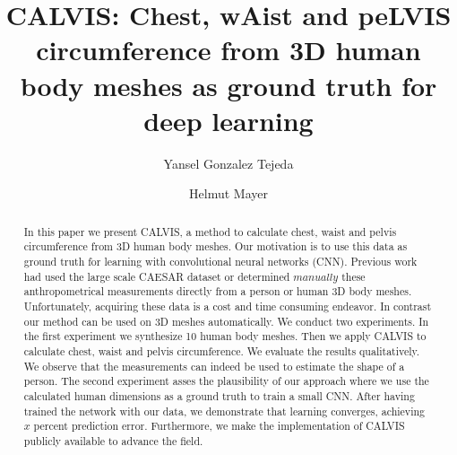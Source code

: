 \documentclass[runningheads, orivec]{llncs}
\begin{document}
%
\title{CALVIS: Chest, wAist and peLVIS circumference from 3D human body meshes	
as ground truth for deep learning}
%
%
\author{Yansel Gonzalez Tejeda \and
Helmut Mayer}
%
%
%
\maketitle              %
%
\begin{abstract}
In this paper we present CALVIS, a method to calculate chest, waist and 
pelvis circumference from 3D human body meshes. Our motivation is to use 
this data as ground truth for learning with convolutional neural networks 
(CNN). Previous work had used the large scale CAESAR dataset or determined 
$\textit{manually}$ these anthropometrical measurements directly from a person 
or human 3D body meshes. 
Unfortunately, acquiring these data is a cost and 
time consuming endeavor. In contrast our method can be used on 
3D meshes automatically. We conduct two experiments. 
In the first experiment we synthesize 10 human body meshes. Then we apply 
CALVIS to calculate chest, waist and pelvis circumference. We evaluate the 
results qualitatively. We observe that the measurements can indeed be used 
to estimate the shape of a person. The second experiment asses the 
plausibility of our approach where we use the calculated human dimensions as 
a ground truth to train a small CNN. After 
having trained the network with 
our data, we demonstrate that learning converges, achieving $x$ percent 
prediction error.
Furthermore, we make the implementation of CALVIS publicly available to 
advance the field.

\end{abstract}
%
%
%
\end{document}
